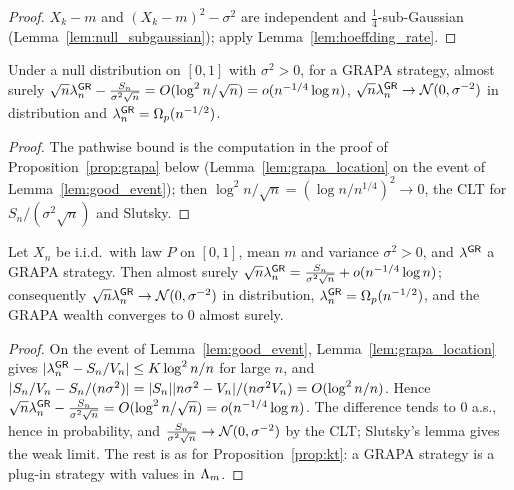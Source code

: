 \begin{proof}
  \leanok
  $X_k - m$ and $(X_k - m)^2 - \sigma^2$ are independent and $\frac14$-sub-Gaussian
  (Lemma~\ref{lem:null_subgaussian}); apply
  Lemma~\ref{lem:hoeffding_rate}.
\end{proof}

\begin{lemma}
  \label{lem:grapa_clt}
  \leanok
  Under a null distribution on $[0,1]$ with $\sigma^2 > 0$, for a GRAPA strategy, almost surely
  $\sqrt n \lambda^{\mathsf{GR}}_n - \frac{S_n}{\sigma^2\sqrt n} = O(\log^2 n/\sqrt n) = o(n^{-1/4}\log n)$,
  $\sqrt n \lambda^{\mathsf{GR}}_n \to \mathcal{N}(0, \sigma^{-2})$ in distribution and $\lambda^{\mathsf{GR}}_n = \Omega_p(n^{-1/2})$.
\end{lemma}

\begin{proof}
  \leanok
  The pathwise bound is the computation in the proof of Proposition~\ref{prop:grapa} below
  (Lemma~\ref{lem:grapa_location} on the event of Lemma~\ref{lem:good_event}); then
  $\log^2 n/\sqrt n = (\log n/n^{1/4})^2 \to 0$, the CLT for $S_n/(\sigma^2\sqrt n)$ and Slutsky.
\end{proof}

\begin{proposition}
  \label{prop:grapa}
  \leanok
  Let $X_n$ be i.i.d.\ with law $P$ on $[0,1]$, mean $m$ and variance $\sigma^2 > 0$, and $\lambda^{\mathsf{GR}}$ a
  GRAPA strategy. Then almost surely
  $\sqrt n \lambda^{\mathsf{GR}}_n = \frac{S_n}{\sigma^2 \sqrt n} + o(n^{-1/4} \log n)$; consequently
  $\sqrt n \lambda^{\mathsf{GR}}_n \to \mathcal{N}(0, \sigma^{-2})$ in distribution, $\lambda^{\mathsf{GR}}_n = \Omega_p(n^{-1/2})$, and the
  GRAPA wealth converges to $0$ almost surely.
\end{proposition}

\begin{proof}
  \leanok
  On the event of Lemma~\ref{lem:good_event}, Lemma~\ref{lem:grapa_location} gives
  $\lvert \lambda^{\mathsf{GR}}_n - S_n/V_n \rvert \le K \log^2 n / n$ for large $n$, and
  $\lvert S_n/V_n - S_n/(n\sigma^2) \rvert = \lvert S_n \rvert\lvert n\sigma^2 - V_n \rvert/(n\sigma^2 V_n) = O(\log^2 n/n)$.
  Hence $\sqrt n \lambda^{\mathsf{GR}}_n - \frac{S_n}{\sigma^2 \sqrt n} = O(\log^2 n/\sqrt n) = o(n^{-1/4}\log n)$.
  The difference tends to $0$ a.s., hence in probability, and $\frac{S_n}{\sigma^2\sqrt n} \to
  \mathcal{N}(0, \sigma^{-2})$ by the CLT; Slutsky's lemma gives the weak limit. The rest is as for
  Proposition~\ref{prop:kt}: a GRAPA strategy is a plug-in strategy with values in $\Lambda_m$.
\end{proof}

